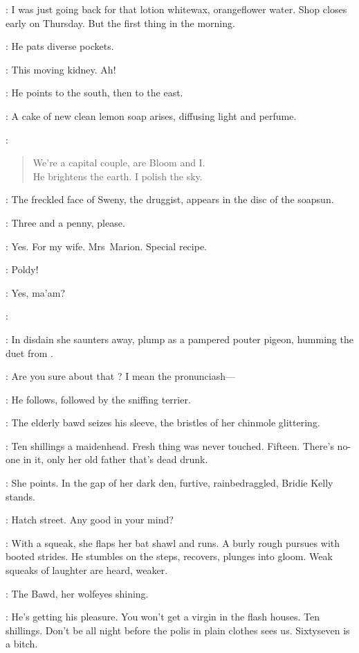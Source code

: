 \Bloom:
I was just going back for that lotion whitewax,
orangeflower water.
Shop closes early on Thursday.
But the first thing in the morning.

:
He pats diverse pockets.

\Bloom:
This moving kidney.
Ah!

:
He points to the south,
then to the east.

:
A cake of new clean lemon soap arises,
diffusing light and perfume.

\Soap:
\begin{verse}
    We're a capital couple,
are Bloom and I.\\
    He brightens the earth.
I polish the sky.
\end{verse}

:
The freckled face of Sweny,
the druggist,
appears in the disc of the soapsun.

\Sweny:
Three and a penny,
please.

\Bloom:
Yes.
For my wife.
Mrs~Marion.
Special recipe.

\Marion:
Poldy!

\Bloom:
Yes,
ma'am?

\Marion:

:
In disdain she saunters away,
plump as a pampered pouter pigeon,
humming the duet from .

\Bloom:
Are you sure about that ?
I mean the pronunciash---

:
He follows,
followed by the sniffing terrier.

:
The elderly bawd seizes his sleeve,
the bristles of her chinmole glittering.

\Bawd:
Ten shillings a maidenhead.
Fresh thing was never touched.
Fifteen.
There's no-one in it,
only her old father that's dead drunk.

:
She points.
In the gap of her dark den,
furtive,
rainbedraggled,
Bridie Kelly stands.

\Bridie:
Hatch street.
Any good in your mind?

:
With a squeak,
she flaps her bat shawl and runs.
A burly rough pursues with booted strides.
He stumbles on the steps,
recovers,
plunges into gloom.
Weak squeaks of laughter are heard,
weaker.

:
The Bawd,
her wolfeyes shining.

\Bawd:
He's getting his pleasure.
You won't get a virgin in the flash houses.
Ten shillings.
Don't be all night before the polis in plain clothes sees us.
Sixtyseven is a bitch.

